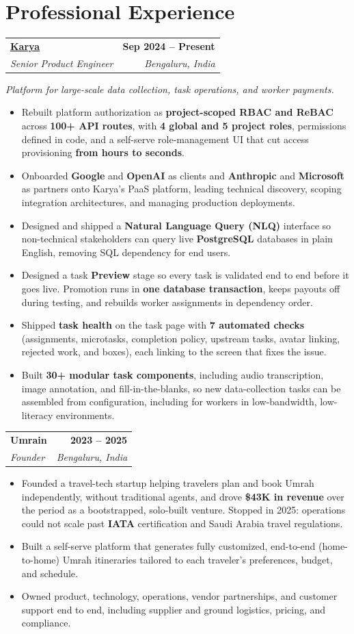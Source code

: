 \documentclass[letterpaper,10.5pt]{article}
\makeatletter
\newcommand{\entry}[4]{%
  \begin{tabularx}{\linewidth}{@{}X@{}r@{}}
    \textbf{#1} & \textbf{#4} \\
    \textit{#2} & \textit{#3} \\
  \end{tabularx}%
  \vspace{1pt}
}
\makeatother
\begin{document}
\section{Professional Experience}

\entry{\href{https://karya.in}{Karya}}{Senior Product Engineer}{Bengaluru, India}{Sep 2024 -- Present}
{\small\textit{Platform for large-scale data collection, task operations, and worker payments.}}
\begin{itemize}
  \item Rebuilt platform authorization as \textbf{project-scoped RBAC and ReBAC} across \textbf{100+ API routes}, with \textbf{4 global and 5 project roles}, permissions defined in code, and a self-serve role-management UI that cut access provisioning \textbf{from hours to seconds}.
  \item Onboarded \textbf{Google} and \textbf{OpenAI} as clients and \textbf{Anthropic} and \textbf{Microsoft} as partners onto Karya's PaaS platform, leading technical discovery, scoping integration architectures, and managing production deployments.
  \item Designed and shipped a \textbf{Natural Language Query (NLQ)} interface so non-technical stakeholders can query live \textbf{PostgreSQL} databases in plain English, removing SQL dependency for end users.
  \item Designed a task \textbf{Preview} stage so every task is validated end to end before it goes live. Promotion runs in \textbf{one database transaction}, keeps payouts off during testing, and rebuilds worker assignments in dependency order.
  \item Shipped \textbf{task health} on the task page with \textbf{7 automated checks} (assignments, microtasks, completion policy, upstream tasks, avatar linking, rejected work, and boxes), each linking to the screen that fixes the issue.
  \item Built \textbf{30+ modular task components}, including audio transcription, image annotation, and fill-in-the-blanks, so new data-collection tasks can be assembled from configuration, including for workers in low-bandwidth, low-literacy environments.
\end{itemize}

\entry{Umrain}{Founder}{Bengaluru, India}{2023 -- 2025}
\begin{itemize}
  \item Founded a travel-tech startup helping travelers plan and book Umrah independently, without traditional agents, and drove \textbf{\$43K in revenue} over the period as a bootstrapped, solo-built venture. Stopped in 2025: operations could not scale past \textbf{IATA} certification and Saudi Arabia travel regulations.
  \item Built a self-serve platform that generates fully customized, end-to-end (home-to-home) Umrah itineraries tailored to each traveler's preferences, budget, and schedule.
  \item Owned product, technology, operations, vendor partnerships, and customer support end to end, including supplier and ground logistics, pricing, and compliance.
\end{itemize}
\end{document}
